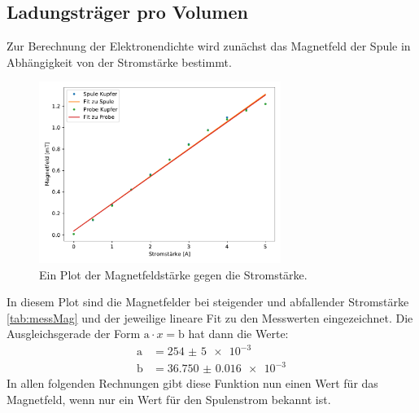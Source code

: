      
    \subsection{Ladungsträger pro Volumen}


    Zur Berechnung der Elektronendichte wird zunächst das Magnetfeld der Spule in Abhängigkeit von der Stromstärke bestimmt.

    \begin{figure}[H]
        \centering
        \includegraphics[width=0.7\textwidth]{build/Magnetfeld.pdf}
        \caption{Ein Plot der Magnetfeldstärke gegen die Stromstärke.}
        \label{img:Magnetfeld}
    \end{figure}
    \noindent
    In diesem Plot sind die Magnetfelder bei steigender und abfallender Stromstärke \ref{tab:messMag} und der jeweilige lineare Fit zu den 
    Messwerten eingezeichnet.
    Die Ausgleichsgerade der Form $\text{a}\cdot x = \text{b}$ hat dann die Werte:
    \begin{align}
        \text{a} & = \num{254(5)e-3}\nonumber\\
        \text{b} & = \num{36.750(16)e-3}\nonumber
    \end{align}
    In allen folgenden Rechnungen gibt diese Funktion nun einen Wert für das Magnetfeld, wenn nur ein Wert für den Spulenstrom bekannt ist.

